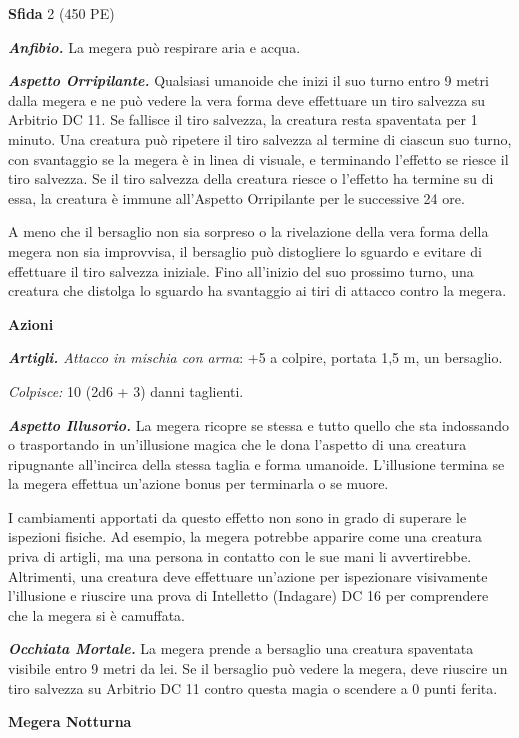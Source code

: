\begin{multicols}{2}
\textbf{Sfida} 2 (450 PE)

\emph{\textbf{Anfibio.}} La megera può respirare aria e acqua.

\emph{\textbf{Aspetto Orripilante.}} Qualsiasi umanoide che inizi il suo
turno entro 9 metri dalla megera e ne può vedere la vera forma deve
effettuare un tiro salvezza su Arbitrio DC 11. Se fallisce il tiro
salvezza, la creatura resta spaventata per 1 minuto. Una creatura può
ripetere il tiro salvezza al termine di ciascun suo turno, con
svantaggio se la megera è in linea di visuale, e terminando l'effetto se
riesce il tiro salvezza. Se il tiro salvezza della creatura riesce o
l'effetto ha termine su di essa, la creatura è immune all'Aspetto
Orripilante per le successive 24 ore.

A meno che il bersaglio non sia sorpreso o la rivelazione della vera
forma della megera non sia improvvisa, il bersaglio può distogliere lo
sguardo e evitare di effettuare il tiro salvezza iniziale. Fino
all'inizio del suo prossimo turno, una creatura che distolga lo sguardo
ha svantaggio ai tiri di attacco contro la megera.

\textbf{Azioni}

\emph{\textbf{Artigli.} Attacco in mischia con arma}: +5 a colpire,
portata 1,5 m, un bersaglio.

\emph{Colpisce:} 10 (2d6 + 3) danni taglienti.

\emph{\textbf{Aspetto Illusorio.}} La megera ricopre se stessa e tutto
quello che sta indossando o trasportando in un'illusione magica che le
dona l'aspetto di una creatura ripugnante all'incirca della stessa
taglia e forma umanoide. L'illusione termina se la megera effettua
un'azione bonus per terminarla o se muore.

I cambiamenti apportati da questo effetto non sono in grado di superare
le ispezioni fisiche. Ad esempio, la megera potrebbe apparire come una
creatura priva di artigli, ma una persona in contatto con le sue mani li
avvertirebbe. Altrimenti, una creatura deve effettuare un'azione per
ispezionare visivamente l'illusione e riuscire una prova di Intelletto
(Indagare) DC 16 per comprendere che la megera si è camuffata.

\emph{\textbf{Occhiata Mortale.}} La megera prende a bersaglio una
creatura spaventata visibile entro 9 metri da lei. Se il bersaglio può
vedere la megera, deve riuscire un tiro salvezza su Arbitrio DC 11
contro questa magia o scendere a 0 punti ferita.

\textbf{Megera Notturna}


\end{multicols}
